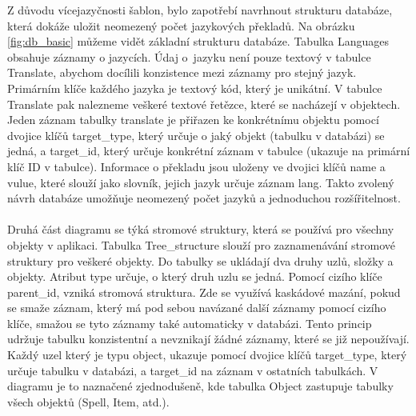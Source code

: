 \documentclass[thesis=B,czech]{resources/FITthesis}[2012/06/26]
\begin{document}
Z důvodu vícejazyčnosti šablon, bylo zapotřebí navrhnout strukturu databáze, která dokáže uložit neomezený počet jazykových překladů. Na obrázku \ref{fig:db_basic} můžeme vidět základní strukturu databáze. Tabulka Languages obsahuje záznamy o jazycích. Údaj o~jazyku není pouze textový v tabulce Translate, abychom docílili konzistence mezi záznamy pro stejný jazyk. Primárním klíče každého jazyka je textový kód, který je unikátní. V tabulce Translate pak nalezneme veškeré textové řetězce, které se nacházejí v objektech. Jeden záznam tabulky translate je přiřazen ke konkrétnímu objektu pomocí dvojice klíčů target\_type, který určuje o jaký objekt (tabulku v databázi) se jedná, a target\_id, který určuje konkrétní záznam v tabulce (ukazuje na primární klíč ID v tabulce). Informace o překladu jsou uloženy ve dvojici klíčů name a vulue, které slouží jako slovník, jejich jazyk určuje záznam lang. Takto zvolený návrh databáze umožňuje neomezený počet jazyků a jednoduchou rozšířitelnost.\\
\\
Druhá část diagramu se týká stromové struktury, která se používá pro všechny objekty v aplikaci. Tabulka Tree\_structure slouží pro zaznamenávání stromové struktury pro veškeré objekty. Do tabulky se ukládají dva druhy uzlů, složky a objekty. Atribut type určuje, o který druh uzlu se jedná. Pomocí cizího klíče parent\_id, vzniká stromová struktura. Zde se využívá kaskádové mazání, pokud se smaže záznam, který má pod sebou navázané další záznamy pomocí cizího klíče, smažou se tyto záznamy také automaticky v databázi. Tento princip udržuje tabulku konzistentní a nevznikají žádné záznamy, které se již nepoužívají. Každý uzel který je typu object, ukazuje pomocí dvojice klíčů target\_type, který určuje tabulku v databázi, a target\_id na záznam v ostatních tabulkách. V diagramu je to naznačené zjednodušeně, kde tabulka Object zastupuje tabulky všech objektů (Spell, Item, atd.). \\
\\
\end{document}
